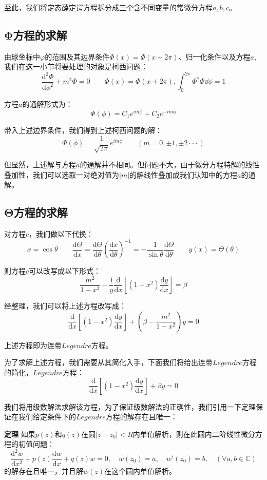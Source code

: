 至此，我们将定态薛定谔方程拆分成三个含不同变量的常微分方程$a,b,c$。
\subsection{Φ方程的求解}
由球坐标中$\varphi$的范围及其边界条件$\varPhi(x)=\varPhi(x+2\pi)$、归一化条件以及方程$a$,我们在这一小节将要处理的对象是柯西问题：
\[\frac{\mathrm{d}^2 \varPhi}{\mathrm{d}{\phi^2}}+ m^2 \varPhi=0 \qquad \varPhi(x)=\varPhi(x+2\pi) ,\int_{0}^{2\pi}\varPhi^{*}\varPhi \dd\phi=1\]

方程$a$的通解形式为：
\[\varPhi(\phi)=C_1 e^{im\phi}+C_2 e^{-im\phi}\]

带入上述边界条件，我们得到上述柯西问题的解：
\[\varPhi(\phi)=\frac{1}{\sqrt{2\pi}}e^{im\phi} \qquad (m=0,\pm 1,\pm 2\cdot\cdot\cdot)\]

但显然，上述解与方程$a$的通解并不相同。但问题不大，由于微分方程特解的线性叠加性，我们可以选取一对绝对值为$|m|$的解线性叠加成我们认知中的方程$a$的通解。

\subsection{Θ方程的求解}
对方程$c$，我们做以下代换：
\[x=\cos\theta \qquad \frac{\mathrm{d} \Theta}{\mathrm{d} x}=\frac{\mathrm{d} \Theta}{\mathrm{d} \theta}\left ( \frac{\mathrm{d} x}{\mathrm{d} \theta} \right )^{-1}=-\frac{1}{\sin\theta} \frac{\mathrm{d} \Theta}{\mathrm{d} \theta} \qquad y(x)=\Theta(\theta)\]

则方程$c$可以改写成以下形式：
\[\frac{m^2}{1-x^2}-\frac{1}{y}\frac{\mathrm{d}}{\mathrm{d}{x}} \left [(1-x^2) \frac{\mathrm{d} y}{\mathrm{d}{x}} \right ]=\beta\]

经整理，我们可以将上述方程改写成：
\[\frac{\mathrm{d}}{\mathrm{d}{x}} \left [(1-x^2) \frac{\mathrm{d} y}{\mathrm{d}{x}} \right ]+\left (\beta- \frac{m^2}{1-x^2} \right )y=0\]

上述方程即为连带$Legendre$方程。

为了求解上述方程，我们需要从其简化入手，下面我们将给出连带$Legendre$方程的简化，$Legendre$方程：
\[\frac{\mathrm{d}}{\mathrm{d}{x}} \left [(1-x^2) \frac{\mathrm{d} y}{\mathrm{d}{x}} \right ]+\beta y=0\]

我们将用级数解法求解该方程，为了保证级数解法的正确性，我们引用一下定理保证在我们给定条件下的$Legendre$方程的解存在且唯一：

\textbf{定理} \qquad 如果$p(z)$和$q(z)$在圆$|z-z_0|<R$内单值解析，则在此圆内二阶线性微分方程的初值问题：
\[\frac{\mathrm{d}^2w}{\mathrm{d}x^2}+p(z)\frac{\mathrm{d}w}{\mathrm{d}x}+q(z)w=0, \quad w(z_0)=a, \quad w'(z_0)=b, \quad (\forall a,b \in \mathbb{C})\]
的解存在且唯一，并且解$w(z)$在这个圆内单值解析。

